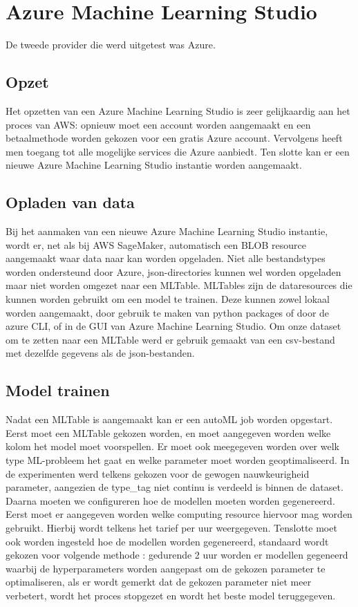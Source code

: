 \chapter{Azure Machine Learning Studio}
De tweede provider die werd uitgetest was Azure.
\section{Opzet}
Het opzetten van een Azure Machine Learning Studio is zeer gelijkaardig aan het proces van AWS: opnieuw moet  een account worden aangemaakt en een betaalmethode worden gekozen voor een gratis Azure account. Vervolgens heeft men toegang tot alle mogelijke services die Azure aanbiedt. Ten slotte kan er een nieuwe Azure Machine Learning Studio instantie worden aangemaakt. 
\section{Opladen van data}
Bij het aanmaken van een nieuwe Azure Machine Learning Studio instantie, wordt er, net als bij AWS SageMaker, automatisch een BLOB resource aangemaakt waar data naar kan worden opgeladen. Niet alle bestandstypes worden ondersteund door Azure, json-directories kunnen wel worden opgeladen maar niet worden omgezet naar een MLTable. MLTables zijn de dataresources die kunnen worden gebruikt om een model te trainen. Deze kunnen zowel lokaal worden aangemaakt, door gebruik te maken van python packages of door de azure CLI, of in de GUI van Azure Machine Learning Studio. Om onze dataset om te zetten naar een MLTable werd er gebruik gemaakt van een csv-bestand met dezelfde gegevens als de json-bestanden. 
\section{Model trainen}
Nadat een MLTable is aangemaakt kan er een autoML job worden opgestart. Eerst moet een MLTable gekozen worden, en moet aangegeven worden welke kolom het model moet voorspellen. Er moet ook meegegeven worden over welk type ML-probleem het gaat en welke parameter  moet worden geoptimaliseerd. In de experimenten werd  telkens gekozen voor de gewogen nauwkeurigheid parameter, aangezien de type\_tag niet continu is verdeeld is binnen de dataset. Daarna moeten we configureren hoe de modellen moeten worden gegenereerd. Eerst moet er aangegeven worden welke computing resource hiervoor mag worden gebruikt. Hierbij wordt telkens het tarief per uur weergegeven. Tenslotte moet  ook worden ingesteld hoe de modellen worden gegenereerd, standaard wordt gekozen voor volgende methode : gedurende 2 uur worden er modellen gegeneerd waarbij de hyperparameters worden aangepast om de gekozen parameter te optimaliseren, als er wordt gemerkt dat de gekozen parameter niet meer verbetert, wordt het proces stopgezet en wordt het beste model teruggegeven. 
